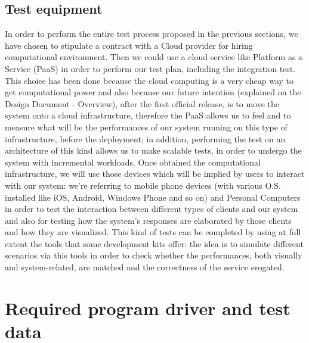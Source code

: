 \documentclass[10pt, a4paper,titlepage]{article}
\begin{document}
\subsection{Test equipment}
In order to perform the entire test process proposed in the previous sections, we have chosen to stipulate a contract with a Cloud provider for hiring computational environment. 
Then we could use a cloud service like Platform as a Service (PaaS) in order to perform our test plan, including the integration test.
This choice has been done because the cloud computing is a very cheap way to get computational power and also because our future intention (explained on the Design Document - Overview), after the first official release, is to move the system onto a cloud infrastructure, therefore the PaaS allows us to feel and to measure what will be the performances of our system running on this type of infrastructure, before the deployment; in addition, performing the test on an architecture of this kind allows us to make scalable tests, in order to undergo the system with incremental workloads. Once obtained the computational infrastructure, we will use those devices which will be implied by users to interact with our system: we’re referring to mobile phone devices (with various O.S. installed like iOS, Android, Windows Phone and so on) and Personal Computers in order to test the interaction between different types of clients and our system and also for testing how the system’s responses are elaborated by those clients and how they are visualized. This kind of tests can be completed by using at full extent the tools that some development kits offer: the idea is to simulate different scenarios via this tools in order to check whether the performances, both visually and system-related, are matched and the correctness of the service erogated. 
\section{Required program driver and test data}
\end{document}
